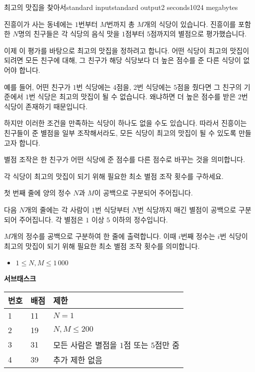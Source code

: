 \begin{problem}{최고의 맛집을 찾아서}{standard input}{standard output}{2 seconds}{1024 megabytes}

진흥이가 사는 동네에는 $1$번부터 $M$번까지 총 $M$개의 식당이 있습니다.
진흥이를 포함한 $N$명의 친구들은 각 식당의 음식 맛을 $1$점부터 $5$점까지의 별점으로 평가했습니다.

이제 이 평가를 바탕으로 최고의 맛집을 정하려고 합니다.
어떤 식당이 최고의 맛집이 되려면 모든 친구에 대해, 그 친구가 해당 식당보다 더 높은 점수를 준 다른 식당이 없어야 합니다.

예를 들어, 어떤 친구가 $1$번 식당에는 $4$점을, $2$번 식당에는 $5$점을 줬다면
그 친구의 기준에서 $1$번 식당은 최고의 맛집이 될 수 없습니다. 왜냐하면 더 높은 점수를 받은 $2$번 식당이 존재하기 때문입니다.

하지만 이러한 조건을 만족하는 식당이 하나도 없을 수도 있습니다.
따라서 진흥이는 친구들이 준 별점을 일부 조작해서라도,
모든 식당이 최고의 맛집이 될 수 있도록 만들고자 합니다.

별점 조작은 한 친구가 어떤 식당에 준 점수를 다른 점수로 바꾸는 것을 의미합니다.

각 식당이 최고의 맛집이 되기 위해 필요한 최소 별점 조작 횟수를 구하세요.

\InputFile
첫 번째 줄에 양의 정수 $N$과 $M$이 공백으로 구분되어 주어집니다.

다음 $N$개의 줄에는 각 사람이 $1$번 식당부터 $N$번 식당까지 매긴 별점이 공백으로 구분되어 주어집니다. 각 별점은 $1$ 이상 $5$ 이하의 정수입니다.

\OutputFile
$M$개의 정수를 공백으로 구분하여 한 줄에 출력합니다.
이때 $i$번째 정수는 $i$번 식당이 최고의 맛집이 되기 위해 필요한 최소 별점 조작 횟수를 의미합니다.

\Scoring
\begin{itemize}
\item $1 \le N, M \le 1\,000$
\end{itemize}

\textbf{서브태스크}
\begin{tabular}{|l|l|l|} \hline
  \textbf{번호} & \textbf{배점} & \textbf{제한} \\ \hline
  1 & 11 & $N = 1$ \\ \hline
  2 & 19 & $N, M \le 200$ \\ \hline
  3 & 31 & 모든 사람은 별점을 $1$점 또는 $5$점만 줌 \\ \hline
  4 & 39 & 추가 제한 없음 \\ \hline
\end{tabular}

\Example

\begin{example}
%
\end{example}

\end{problem}

